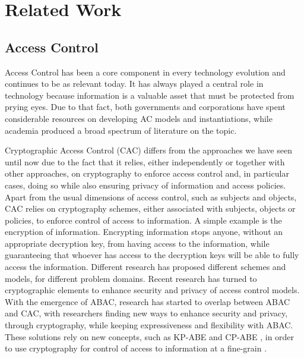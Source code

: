 \section{Related Work}
\label{chap:related}

\subsection{Access Control}
\label{sec:related-ac}

Access Control has been a core component in every technology evolution and continues to be as relevant today. It has always played a central role in technology because information is a valuable asset that must be protected from prying eyes. Due to that fact, both governments and corporations have spent considerable resources on developing AC models and instantiations, while academia produced a broad spectrum of literature on the topic.

Cryptographic Access Control (CAC) differs from the approaches we have seen until now due to the fact that it relies, either independently or together with other approaches, on cryptography to enforce access control and, in particular cases, doing so while also ensuring privacy of information and access policies. Apart from the usual dimensions of access control, such as subjects and objects, CAC relies on cryptography schemes, either associated with subjects, objects or policies, to enforce control of access to information. A simple example is the encryption of information. Encrypting information stops anyone, without an appropriate decryption key, from having access to the information, while guaranteeing that whoever has access to the decryption keys will be able to fully access the information. Different research has proposed different schemes and models, for different problem domains. Recent research has turned to cryptographic elements to enhance security and privacy of access control models. With the emergence of ABAC, research has started to overlap between ABAC and CAC, with researchers finding new ways to enhance security and privacy, through cryptography, while keeping expressiveness and flexibility with ABAC. These solutions rely on new concepts, such as KP-ABE \cite{goyal_attribute-based_2006} and CP-ABE \cite{bethencourt_ciphertext-policy_2007}, in order to use cryptography for control of access to information at a fine-grain \cite{wan_hasbe:_2012, ruj_privacy_2012, wang_hierarchical_2010}.

